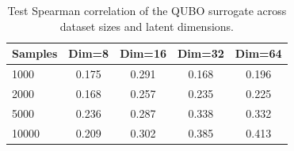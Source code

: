 \begin{table}[t]
\centering
\small
\begin{tabular}{lcccc}
\hline
Samples & Dim=8 & Dim=16 & Dim=32 & Dim=64 \\
\hline
1000 & 0.175 & 0.291 & 0.168 & 0.196 \\
2000 & 0.168 & 0.257 & 0.235 & 0.225 \\
5000 & 0.236 & 0.287 & 0.338 & 0.332 \\
10000 & 0.209 & 0.302 & 0.385 & 0.413 \\
\hline
\end{tabular}
\caption{Test Spearman correlation of the QUBO surrogate across dataset sizes and latent dimensions.}
\label{tab:surrogate_spearman}
\end{table}